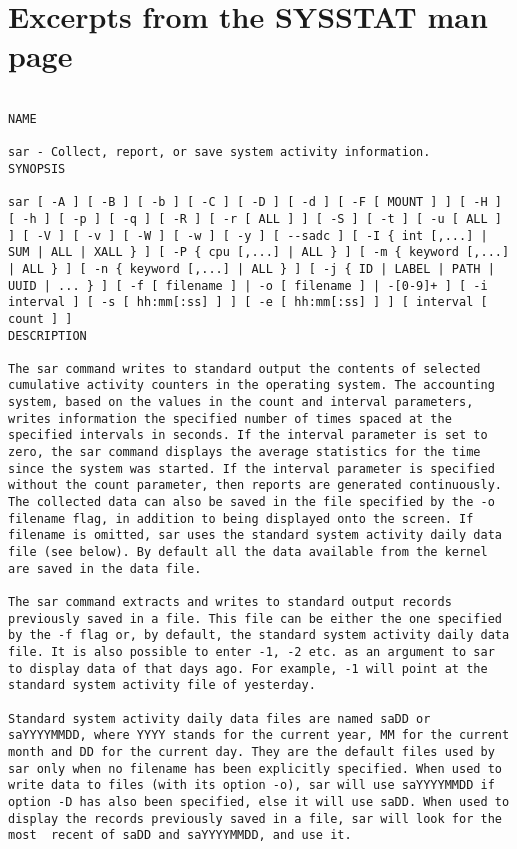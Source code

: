 
\chapter{Excerpts from the SYSSTAT man page} %

\label{SYSSTAT} 



\begin{verbatim}

NAME

sar - Collect, report, or save system activity information.
SYNOPSIS

sar [ -A ] [ -B ] [ -b ] [ -C ] [ -D ] [ -d ] [ -F [ MOUNT ] ] [ -H ] [ -h ] [ -p ] [ -q ] [ -R ] [ -r [ ALL ] ] [ -S ] [ -t ] [ -u [ ALL ] ] [ -V ] [ -v ] [ -W ] [ -w ] [ -y ] [ --sadc ] [ -I { int [,...] | SUM | ALL | XALL } ] [ -P { cpu [,...] | ALL } ] [ -m { keyword [,...] | ALL } ] [ -n { keyword [,...] | ALL } ] [ -j { ID | LABEL | PATH | UUID | ... } ] [ -f [ filename ] | -o [ filename ] | -[0-9]+ ] [ -i interval ] [ -s [ hh:mm[:ss] ] ] [ -e [ hh:mm[:ss] ] ] [ interval [ count ] ]
DESCRIPTION

The sar command writes to standard output the contents of selected cumulative activity counters in the operating system. The accounting system, based on the values in the count and interval parameters, writes information the specified number of times spaced at the specified intervals in seconds. If the interval parameter is set to zero, the sar command displays the average statistics for the time since the system was started. If the interval parameter is specified without the count parameter, then reports are generated continuously. The collected data can also be saved in the file specified by the -o filename flag, in addition to being displayed onto the screen. If filename is omitted, sar uses the standard system activity daily data file (see below). By default all the data available from the kernel are saved in the data file.

The sar command extracts and writes to standard output records previously saved in a file. This file can be either the one specified by the -f flag or, by default, the standard system activity daily data file. It is also possible to enter -1, -2 etc. as an argument to sar to display data of that days ago. For example, -1 will point at the standard system activity file of yesterday.

Standard system activity daily data files are named saDD or saYYYYMMDD, where YYYY stands for the current year, MM for the current month and DD for the current day. They are the default files used by sar only when no filename has been explicitly specified. When used to write data to files (with its option -o), sar will use saYYYYMMDD if option -D has also been specified, else it will use saDD. When used to display the records previously saved in a file, sar will look for the most  recent of saDD and saYYYYMMDD, and use it.


\end{verbatim}
